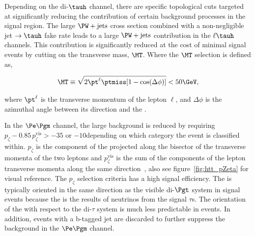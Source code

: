 Depending on the di-$\tauh$ channel, there are specific topological cuts targeted at significantly
reducing the contribution of certain background processes in the signal region.  The large $\PW+\text{jets}$
cross section combined with a non-negligible jet $\to \tauh$ fake rate leads to a large $\PW+\text{jets}$
contribution in the $\ell\tauh$ channels.  This contribution is significantly reduced at the cost of
minimal signal events by cutting on the transverse mass, $\MT$.  Where the $\MT$ selection is defined as,

\begin{equation}
\MT \equiv \sqrt{\smash[b]{2 \pt^\ell \ptmiss [1-\cos(\Delta\phi)]}} < 50\GeV,
\end{equation}

where $\pt^\ell$ is the transverse momentum of the lepton $\ell$,
and $\Delta\phi$ is the azimuthal angle between its direction and the \etvecmiss.

In the $\Pe\Pgm$ channel, the large \ttbar background is reduced by requiring 
$p_\zeta - 0.85 \, p_\zeta^{\text{vis}} > -35$ or $-10$\GeV depending on which category the event is
classified within.  $p_\zeta$ is the component of the \etvecmiss projected along the bisector 
of the transverse momenta of the two leptons and $p_\zeta^{\text{vis}}$ is the sum of the components 
of the lepton transverse momenta along the same direction~\cite{Khachatryan:2014wca}, also see
figure~\ref{fig:htt_pZeta} for visual reference.
The $p_\zeta$ selection criteria has a high signal efficiency. The \etvecmiss is typically oriented
in the same direction as the visible di-$\Pgt$ system in signal events because the \etvecmiss is 
the results of neutrinos from the signal $\tau$s.  The orientation of the \etvecmiss with respect
to the di-$\tau$ system is much less predictable in \ttbar events.  In addition, events with a b-tagged 
jet are discarded to further suppress the \ttbar background in the $\Pe\Pgm$ channel.

